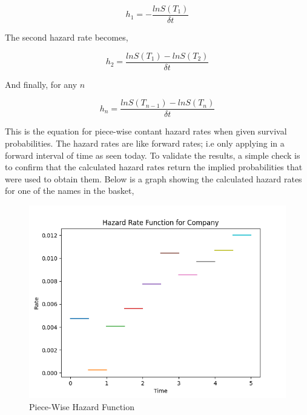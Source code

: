 \documentclass[a4paper,12pt]{article}
\begin{document}
$$h_1 = -\frac{lnS(T_1)}{\delta t} $$
 
The second hazard rate becomes, 

$$h_2 = \frac{lnS(T_1) - lnS(T_2)}{\delta t} $$

And finally, for any $n$ 

\begin{equation}
h_n = \frac{lnS(T_{n - 1}) - lnS(T_n)}{\delta t}
\end{equation}

This is the equation for piece-wise contant hazard rates when given survival probabilities. The hazard rates are like forward rates; i.e only applying in a forward interval of time as seen today. To validate the results, a simple check is to confirm that the calculated hazard rates return the implied probabilities that were used to obtain them. Below is a graph showing the calculated hazard rates for one of the names in the basket, 

\begin{figure}[h]

\centering
\includegraphics[width=1\textwidth]{hazard_rate_function}
\caption{Piece-Wise Hazard Function}
\label{image-hazard_rate_function}

\end{figure}
\end{document}
